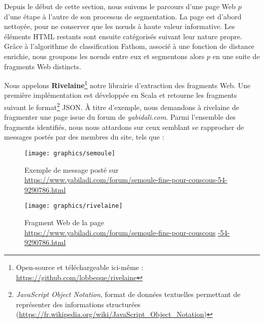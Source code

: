 \documentclass[symmetric,justified,marginals=raggedouter]{tufte-book}
\begin{document}
\noindent Depuis le début de cette section, nous suivons le parcours d'une page Web $p$ d'une étape à l'autre de son processus de segmentation. La page est d'abord nettoyée, pour ne conserver que les nœuds à haute valeur informative. Les éléments HTML restants sont ensuite catégorisés suivant leur nature propre. Grâce à l'algorithme de classification Fathom, associé à une fonction de distance enrichie, nous groupons les nœuds entre eux et segmentons alors $p$ en une suite de fragments Web distincts. 

Nous appelons \textbf{Rivelaine}\footnote{\RaggedOuter Open-source et téléchargeable ici-même : \url{https://github.com/lobbeque/rivelaine}} notre librairie d'extraction des fragments Web. Une première implémentation est développée en Scala et retourne les fragments suivant le format\footnote{\RaggedOuter \textit{JavaScript Object Notation}, format de données textuelles permettant de représenter des informations structurées (\url{https://fr.wikipedia.org/wiki/JavaScript\_Object\_Notation})} JSON. À titre d'exemple, nous demandons à rivelaine de fragmenter une page issue du forum de \textit{yabidali.com}. Parmi l'ensemble des fragments identifiés, nous nous attardons sur ceux semblant se rapprocher de messages postés par des membres du site, tels que :

\begin{figure}%
  \texttt{[image: graphics/semoule]}
  \vspace*{0.2cm}  
  \caption{Exemple de message posté sur \url{https://www.yabiladi.com/forum/semoule-fine-pour-couscous-54-9290786.html}}
  \label{fig:semoule}
\end{figure}

\newpage

\begin{figure*}%
  \texttt{[image: graphics/rivelaine]}
  \caption{Fragment Web de la page \url{https://www.yabiladi.com/forum/semoule-fine-pour-couscous} \url{-54-9290786.html}}
  \label{fig:rivelaine}
\end{figure*}
\end{document}
